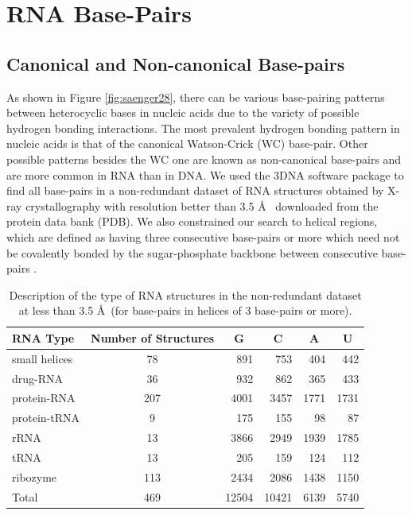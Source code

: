 \chapter{RNA Base-Pairs}
\label{basepairs} 

\section{Canonical and Non-canonical Base-pairs}
As  shown   in  Figure  \ref{fig:saenger28},  there   can  be  various
base-pairing patterns between heterocyclic  bases in nucleic acids due
to the  variety of possible  hydrogen bonding interactions.   The most
prevalent hydrogen  bonding pattern  in nucleic acids  is that  of the
canonical  Watson-Crick  (WC)  base-pair.   Other  possible  patterns
besides the WC one are known as non-canonical base-pairs and are more
common in  RNA than in DNA.   We used the  3DNA \cite{lu2003} software
package  to find  all base-pairs  in  a non-redundant  dataset of  RNA
structures  obtained by X-ray  crystallography with  resolution better
than 3.5  \AA~ downloaded from the  protein data bank  (PDB).  We also
constrained our search to helical regions, which are defined as having
three  consecutive base-pairs  or more  which need  not  be covalently
bonded by the  sugar-phosphate backbone between consecutive base-pairs
\cite{olson2009}.

\begin{table}[htbp]
\begin{center}
\begin{tabular}{|l|c|r|r|r|r|}
\hline
RNA Type & \multicolumn{1}{p{2cm}|}{Number of Structures} & \multicolumn{1}{c|}{G} &
\multicolumn{1}{c|}{C} & \multicolumn{1}{c|}{A} &
\multicolumn{1}{c|}{U} \\ \hline 
small helices & 78 & 891 & 753 & 404 & 442 \\ \hline
drug-RNA & 36 & 932 & 862 & 365 & 433 \\ \hline
protein-RNA & 207 & 4001 & 3457 & 1771 & 1731 \\ \hline
protein-tRNA & 9 & 175 & 155 & 98 & 87 \\ \hline
rRNA & 13 & 3866 & 2949 & 1939 & 1785 \\ \hline
tRNA & 13 & 205 & 159 & 124 & 112 \\ \hline
ribozyme & 113 & 2434 & 2086 & 1438 & 1150 \\ \hline
Total & 469 & \multicolumn{1}{c|}{12504} & \multicolumn{1}{c|}{10421} & \multicolumn{1}{c|}{6139} & \multicolumn{1}{c|}{5740} \\ \hline
\end{tabular}
\caption{Description   of  the   type   of  RNA   structures  in   the
  non-redundant  dataset  at  less  than 3.5  \AA~(for  base-pairs  in
  helices of 3 base-pairs or more).}
\label{tab:dbase}
\end{center}
\end{table}


